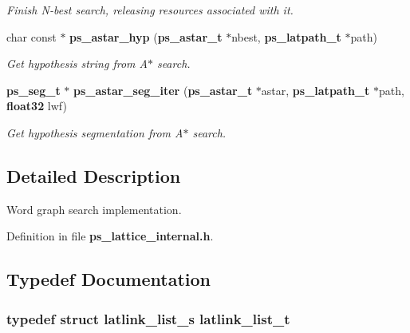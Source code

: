 \begin{DoxyCompactItemize}
\begin{DoxyCompactList}\small\item\em \-Finish \-N-\/best search, releasing resources associated with it. \end{DoxyCompactList}\item 
char const $\ast$ {\bf ps\-\_\-astar\-\_\-hyp} ({\bf ps\-\_\-astar\-\_\-t} $\ast$nbest, {\bf ps\-\_\-latpath\-\_\-t} $\ast$path)\label{ps__lattice__internal_8h_ac7372b5c5ec111f6814ce1ba495593e4}

\begin{DoxyCompactList}\small\item\em \-Get hypothesis string from \-A$\ast$ search. \end{DoxyCompactList}\item 
{\bf ps\-\_\-seg\-\_\-t} $\ast$ {\bf ps\-\_\-astar\-\_\-seg\-\_\-iter} ({\bf ps\-\_\-astar\-\_\-t} $\ast$astar, {\bf ps\-\_\-latpath\-\_\-t} $\ast$path, {\bf float32} lwf)\label{ps__lattice__internal_8h_ac8e3dff7276c03c93377d0cb79fbdbd7}

\begin{DoxyCompactList}\small\item\em \-Get hypothesis segmentation from \-A$\ast$ search. \end{DoxyCompactList}\end{DoxyCompactItemize}


\subsection{\-Detailed \-Description}
\-Word graph search implementation. 

\-Definition in file {\bf ps\-\_\-lattice\-\_\-internal.\-h}.



\subsection{\-Typedef \-Documentation}
\subsubsection[{latlink\-\_\-list\-\_\-t}]{\setlength{\rightskip}{0pt plus 5cm}typedef struct {\bf latlink\-\_\-list\-\_\-s}  {\bf latlink\-\_\-list\-\_\-t}}\label{ps__lattice__internal_8h_a32dd9511afc2f024dc63c9c060261e94}


